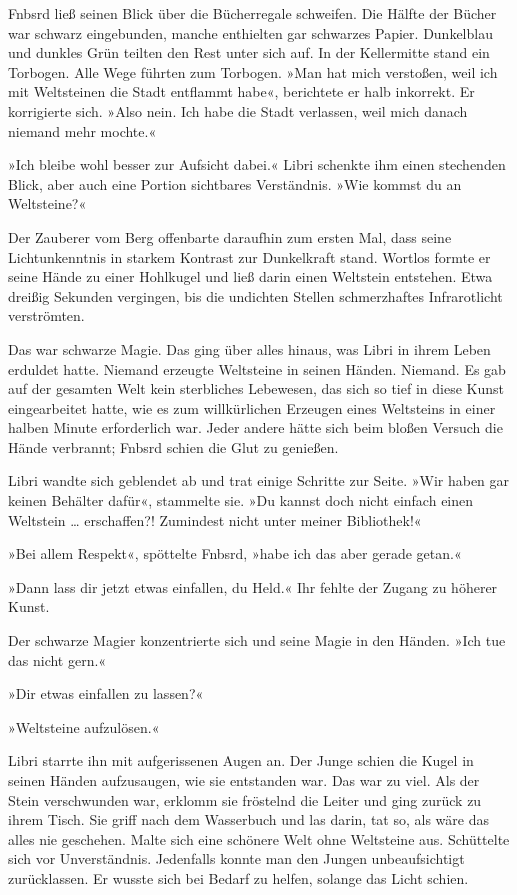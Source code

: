 Fnbsrd ließ seinen Blick über die Bücherregale schweifen. Die Hälfte der Bücher war schwarz eingebunden, manche enthielten gar schwarzes Papier. Dunkelblau und dunkles Grün teilten den Rest unter sich auf. In der Kellermitte stand ein Torbogen. Alle Wege führten zum Torbogen. »Man hat mich verstoßen, weil ich mit Weltsteinen die Stadt entflammt habe«, berichtete er halb inkorrekt. Er korrigierte sich. »Also nein. Ich habe die Stadt verlassen, weil mich danach niemand mehr mochte.«

»Ich bleibe wohl besser zur Aufsicht dabei.« Libri schenkte ihm einen stechenden Blick, aber auch eine Portion sichtbares Verständnis. »Wie kommst du an Weltsteine?«

Der Zauberer vom Berg offenbarte daraufhin zum ersten Mal, dass seine Lichtunkenntnis in starkem Kontrast zur Dunkelkraft stand. Wortlos formte er seine Hände zu einer Hohlkugel und ließ darin einen Weltstein entstehen. Etwa dreißig Sekunden vergingen, bis die undichten Stellen schmerzhaftes Infrarotlicht verströmten.

Das war schwarze Magie. Das ging über alles hinaus, was Libri in ihrem Leben erduldet hatte. Niemand erzeugte Weltsteine in seinen Händen. Niemand. Es gab auf der gesamten Welt kein sterbliches Lebewesen, das sich so tief in diese Kunst eingearbeitet hatte, wie es zum willkürlichen Erzeugen eines Weltsteins in einer halben Minute erforderlich war. Jeder andere hätte sich beim bloßen Versuch die Hände verbrannt; Fnbsrd schien die Glut zu genießen.

Libri wandte sich geblendet ab und trat einige Schritte zur Seite. »Wir haben gar keinen Behälter dafür«, stammelte sie. »Du kannst doch nicht einfach einen Weltstein … erschaffen?! Zumindest nicht unter meiner Bibliothek!«

»Bei allem Respekt«, spöttelte Fnbsrd, »habe ich das aber gerade getan.«

»Dann lass dir jetzt etwas einfallen, du Held.« Ihr fehlte der Zugang zu höherer Kunst.

Der schwarze Magier konzentrierte sich und seine Magie in den Händen. »Ich tue das nicht gern.«

»Dir etwas einfallen zu lassen?«

»Weltsteine aufzulösen.«

Libri starrte ihn mit aufgerissenen Augen an. Der Junge schien die Kugel in seinen Händen aufzusaugen, wie sie entstanden war. Das war zu viel. Als der Stein verschwunden war, erklomm sie fröstelnd die Leiter und ging zurück zu ihrem Tisch. Sie griff nach dem Wasserbuch und las darin, tat so, als wäre das alles nie geschehen. Malte sich eine schönere Welt ohne Weltsteine aus. Schüttelte sich vor Unverständnis. Jedenfalls konnte man den Jungen unbeaufsichtigt zurücklassen. Er wusste sich bei Bedarf zu helfen, solange das Licht schien.

